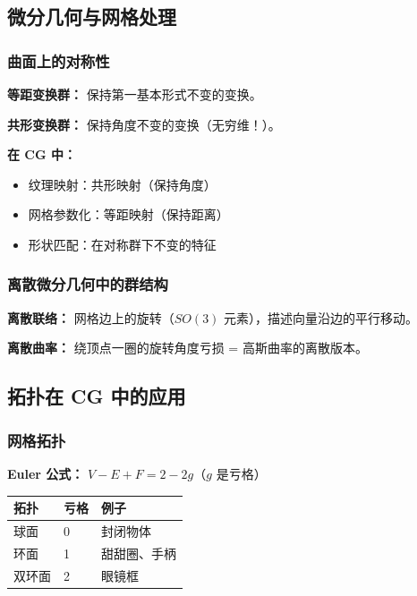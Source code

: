 \subsection{微分几何与网格处理}

\subsubsection{曲面上的对称性}

\textbf{等距变换群：} 保持第一基本形式不变的变换。

\textbf{共形变换群：} 保持角度不变的变换（无穷维！）。

\textbf{在 CG 中：}
\begin{itemize}
  \item 纹理映射：共形映射（保持角度）
  \item 网格参数化：等距映射（保持距离）
  \item 形状匹配：在对称群下不变的特征
\end{itemize}

\subsubsection{离散微分几何中的群结构}

\textbf{离散联络：} 网格边上的旋转（$SO(3)$ 元素），描述向量沿边的平行移动。

\textbf{离散曲率：} 绕顶点一圈的旋转角度亏损 = 高斯曲率的离散版本。

\subsection{拓扑在 CG 中的应用}

\subsubsection{网格拓扑}

\textbf{Euler 公式：} $V - E + F = 2 - 2g$（$g$ 是亏格）

\begin{center}
\begin{tabular}{p{3cm}p{2cm}p{5cm}}
\toprule
\textbf{拓扑} & \textbf{亏格} & \textbf{例子} \\
\midrule
球面 & 0 & 封闭物体 \\
环面 & 1 & 甜甜圈、手柄 \\
双环面 & 2 & 眼镜框 \\
\bottomrule
\end{tabular}
\end{center}

